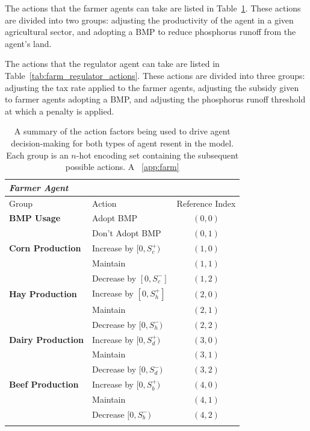 The actions that the farmer agents can take are listed in
Table~\ref{tab:farm_agents_actions}.
These actions are divided into two groups:
adjusting the productivity of the agent in a given agricultural sector,
and adopting a BMP to reduce phosphorus runoff from the agent's land.

The actions that the regulator agent can take are listed in
Table~\ref{tab:farm_regulator_actions}.
These actions are divided into three groups:
adjusting the tax rate applied to the farmer agents,
adjusting the subsidy given to farmer agents adopting a BMP,
and adjusting the phosphorus runoff threshold at which a penalty is applied.

\begin{table}
    \caption{A summary of the action factors being used to drive agent
    decision-making for both types of agent resent in the model.
    Each group is an $n$-hot encoding set containing the subsequent
    possible actions. A ~\ref{app:farm}}
    \label{tab:farm_agents_actions}
    \begin{tabularx}{0.9\linewidth}{lXc}
        \emph{Farmer Agent} \\
        \hline\hline
        Group & Action & Reference Index \\
        \hline
        \textbf{BMP Usage} & Adopt BMP & $(0,0)$ \\
        & Don't Adopt BMP & $(0,1)$ \\
        \textbf{Corn Production} & Increase by $[0, S^+_c)$ & $(1,0)$ \\
        & Maintain & $(1,1)$ \\
        & Decrease by $[0, S^-_c]$ & $(1,2)$ \\
        \textbf{Hay Production} & Increase by $[0, S^+_h]$ & $(2,0)$ \\
        & Maintain & $(2,1)$ \\
        & Decrease by $[0, S^-_h)$ & $(2,2)$ \\
        \textbf{Dairy Production} & Increase by $[0, S^+_d)$ & $(3,0)$ \\
        & Maintain & $(3,1)$ \\
        & Decrease by $[0, S^-_d)$ & $(3,2)$ \\
        \textbf{Beef Production} & Increase by $[0, S^+_b)$ & $(4,0)$ \\
        & Maintain & $(4,1)$ \\
        & Decrease $[0, S^-_b)$ & $(4,2)$ \\
        \hline \\[1.0em]

\end{tabularx}
\end{table}
